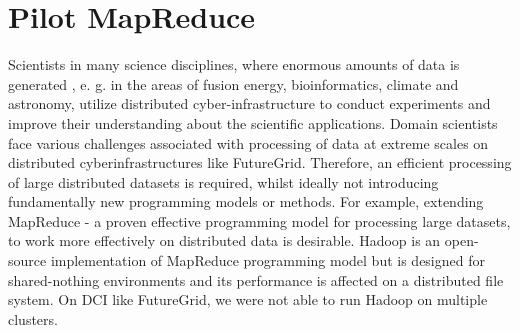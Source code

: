\documentclass[]{paper}
\begin{document}

\section{Pilot MapReduce}


Scientists in many science disciplines, where enormous amounts of data is generated , e. g. in the areas of fusion energy, bioinformatics, climate and astronomy, utilize distributed cyber-infrastructure to conduct experiments and improve their understanding about the scientific applications. Domain scientists face various challenges associated with processing of data at extreme scales on distributed cyberinfrastructures like FutureGrid. Therefore, an efficient processing of large distributed datasets is required, whilst ideally not introducing fundamentally new programming models or methods. For example, extending MapReduce - a proven effective programming model for processing large datasets, to work more effectively on distributed data is desirable. Hadoop is an open-source implementation of MapReduce programming model but is designed for shared-nothing environments and its performance is affected on a distributed file system.  On DCI like FutureGrid, we were not able to run Hadoop on multiple clusters.
\end{document}
